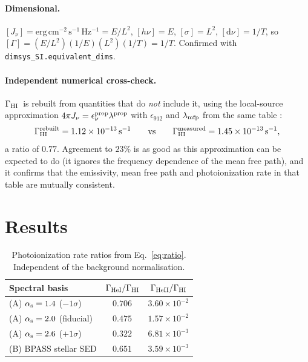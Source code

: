 \documentclass[11pt,a4paper]{article}
\newcommand{\GHI}{\ensuremath{\Gamma_{\rm HI}}}
\newcommand{\GHeI}{\ensuremath{\Gamma_{\rm HeI}}}
\newcommand{\GHeII}{\ensuremath{\Gamma_{\rm HeII}}}
\begin{document}
\paragraph{Dimensional.}
$[J_\nu]=\mathrm{erg\,cm^{-2}\,s^{-1}\,Hz^{-1}}=E/L^2$, $[h\nu]=E$,
$[\sigma]=L^2$, $[\mathrm{d}\nu]=1/T$, so
$[\Gamma]=(E/L^2)(1/E)(L^2)(1/T)=1/T$.  Confirmed with
\texttt{dimsys\_SI.equivalent\_dims}.

\paragraph{Independent numerical cross-check.}
\GHI\ is rebuilt from quantities that do \emph{not} include it, using the
local-source approximation $4\pi J_\nu=\epsilon_\nu^{\rm prop}\lambda^{\rm prop}$
with $\epsilon_{912}$ and $\lambda_{\rm mfp}$ from the same table
\citep{Gaikwad2023}:
\[
  \Gamma_{\rm HI}^{\rm rebuilt}=1.12\times10^{-13}\,{\rm s^{-1}}
  \qquad\text{vs}\qquad
  \Gamma_{\rm HI}^{\rm measured}=1.45\times10^{-13}\,{\rm s^{-1}},
\]
a ratio of $0.77$.  Agreement to $23\%$ is as good as this approximation can
be expected to do (it ignores the frequency dependence of the mean free path),
and it confirms that the emissivity, mean free path and photoionization rate in
that table are mutually consistent.

\section{Results}
\label{sec:results}

\begin{table}[htbp]
\centering
\caption{Photoionization rate ratios from Eq.~\ref{eq:ratio}.  Independent of
the background normalisation.}
\label{tab:ratios}
\begin{tabular}{@{}l c c@{}}
\toprule
Spectral basis & $\GHeI/\GHI$ & $\GHeII/\GHI$ \\
\midrule
(A) $\alpha_{\rm s}=1.4$ ($-1\sigma$)        & $0.706$ & $3.60\times10^{-2}$ \\
(A) $\alpha_{\rm s}=2.0$ (fiducial)          & $0.475$ & $1.57\times10^{-2}$ \\
(A) $\alpha_{\rm s}=2.6$ ($+1\sigma$)        & $0.322$ & $6.81\times10^{-3}$ \\
(B) BPASS stellar SED \citep{Eide2020}       & $0.651$ & $3.59\times10^{-3}$ \\
\bottomrule
\end{tabular}
\end{table}
\end{document}
